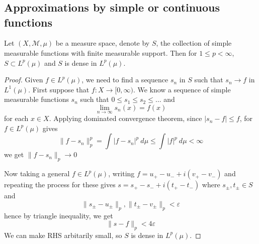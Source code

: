 
\chapter{}

\section{Approximations by simple or continuous functions}
\begin{theorem}
  Let $(X, \mathcal{M}, \mu)$ be a measure space, denote by $S$, the
  collection of simple measurable functions with finite measurable support.
  Then for $1 \le p < \infty$, $ S \subset L^p(\mu)$ and $S$ is
  dense in $L^p(\mu)$.
\end{theorem}
\begin{proof}
  Given $f \in L^p(\mu)$, we need to find a sequence $s_n$ in $S$
  such that $s_n \to f$ in $L^1(\mu)$. First suppose that $f: X \to
  [0, \infty)$. We know a sequence of simple measurable functions
  $s_n$ such that $0 \le s_1 \le s_2 \le \ldots$ and \[
    \lim_{n \to \infty} s_n(x) = f(x)
  \]
  for each $x \in X$. Applying dominated convergence theorem, since
  $|s_n - f| \le f$, for $f \in L^p(\mu)$ gives \[
    \|f - s_n\|^p_p = \int |f - s_n|^p \ d \mu \le \int |f|^p \ d \mu < \infty
  \]
  we get $\|f - s_n\|_p \to 0$

  Now taking a general $f \in L^p(\mu)$, writing $f = u_+ - u_- +
  i(v_+ - v_-)$ and repeating the process for these gives $s = s_+ -
  s_- + i(t_+ - t_-)$ where $s_\pm, t_\pm \in S$ and \[
    \|s_\pm - u_\pm\|_p, \|t_\pm - v_\pm\|_p < \varepsilon
  \]
  hence by triangle inequality, we get \[
    \|s - f\|_p < 4 \varepsilon
  \]
  We can make RHS arbitarily small, so $S$ is dense in $L^p(\mu)$.
\end{proof}

